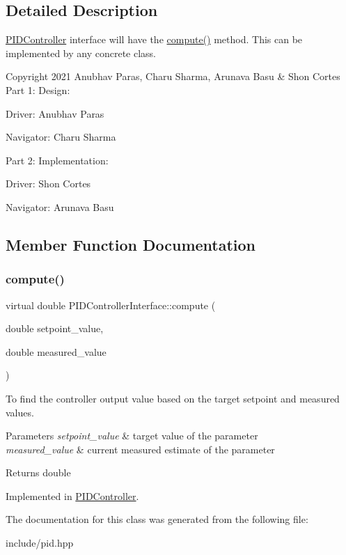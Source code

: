 \subsection{Detailed Description}
\hyperlink{classPIDController}{P\+I\+D\+Controller} interface will have the \hyperlink{classPIDControllerInterface_a6b5340968cb9d235cf3b52bd61c973e1}{compute()} method. This can be implemented by any concrete class. 

Copyright 2021 Anubhav Paras, Charu Sharma, Arunava Basu \& Shon Cortes  Part 1\+: Design\+:
\begin{DoxyItemize}
\item Driver\+: Anubhav Paras
\item Navigator\+: Charu Sharma
\end{DoxyItemize}

Part 2\+: Implementation\+:
\begin{DoxyItemize}
\item Driver\+: Shon Cortes
\item Navigator\+: Arunava Basu 
\end{DoxyItemize}

\subsection{Member Function Documentation}
\mbox{\label{classPIDControllerInterface_a6b5340968cb9d235cf3b52bd61c973e1}} 
\subsubsection{\texorpdfstring{compute()}{compute()}}
{\footnotesize\ttfamily virtual double P\+I\+D\+Controller\+Interface\+::compute (\begin{DoxyParamCaption}\item[{double}]{setpoint\+\_\+value,  }\item[{double}]{measured\+\_\+value }\end{DoxyParamCaption})\hspace{0.3cm}{\ttfamily [pure virtual]}}



To find the controller output value based on the target setpoint and measured values. 


\begin{DoxyParams}{Parameters}
{\em setpoint\+\_\+value} & target value of the parameter \\
\hline
{\em measured\+\_\+value} & current measured estimate of the parameter \\
\hline
\end{DoxyParams}
\begin{DoxyReturn}{Returns}
double 
\end{DoxyReturn}


Implemented in \hyperlink{classPIDController_a0b57631654b460a4668f01b7cc0c8ecb}{P\+I\+D\+Controller}.



The documentation for this class was generated from the following file\+:\begin{DoxyCompactItemize}
\item 
include/pid.\+hpp\end{DoxyCompactItemize}
